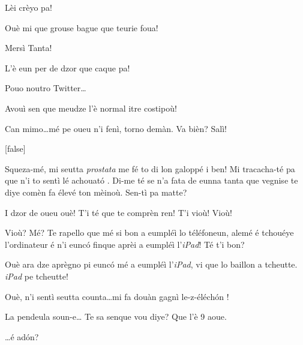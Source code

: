 \begin{drama}
\Alicespeaks Lèi crèyo pa!

\Tanteunspeaks Ouè mi que grouse bague que teurie foua!

\Alicespeaks{} Mersì Tanta!

\Tantaspeaks{} L'è eun per de dzor que caque pa!

\Alicespeaks Pouo noutro Twitter\ldots

\Tanteunspeaks{} Avouì sen que meudze l'è normal itre costipoù!

\Tantaspeaks Can mimo\ldots mé pe oueu n'i fenì, torno demàn. Va bièn? Salì!

[false]%






\Vioupspeaks Squeza-m\'e, mi seutta \textit{prostata} me fé to di lon galoppé i ben! Mi tracacha-t\'e pa que n'i to sentì lé achouat\'o .  Di-me té se n'a fata de eunna tanta que vegnise te diye comèn fa élevé ton mèinoù. Sen-tì pa matte?

\Vioujspeaks I dzor de oueu ouè! T'i té que te comprèn ren! T'i  vioù! Vioù!

\Vioupspeaks{} Vioù? Mé? Te rapello que mé si bon a eumpl\'eì lo téléfoneun, alemé é tchouéye l'ordinateur é n'i eunc\'o finque aprèi a eumpl\'eì l'\textit{iPad}! Té t'i bon?

\Vioujspeaks Ouè ara dze aprègno pi eunc\'o mé a eumpl\'eì l'\textit{iPad}, vi que lo baillon a tcheutte. \textit{iPad} pe tcheutte!

\Vioupspeaks Ouè, n'i sentì seutta counta\ldots mi fa douàn gagnì le-z-é\-lé\-ch\'on !



\Vioupspeaks La pendeula soun-e\ldots {} Te sa senque vou diye? Que l'è 9 aoue.

\Vioujspeaks \ldots é ad\'on?


\end{drama}
